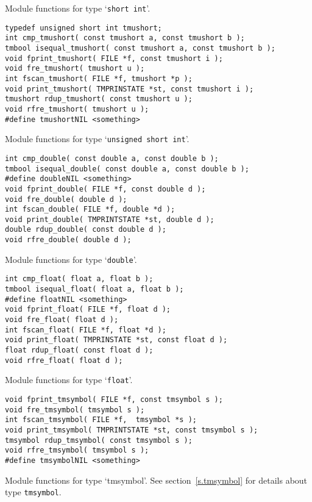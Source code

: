 \begin{desc}
Module functions for type `{\tt short int}'.
\end{desc}
\begin{verbatim}
typedef unsigned short int tmushort;
int cmp_tmushort( const tmushort a, const tmushort b );
tmbool isequal_tmushort( const tmushort a, const tmushort b );
void fprint_tmushort( FILE *f, const tmushort i );
void fre_tmushort( tmushort u );
int fscan_tmushort( FILE *f, tmushort *p );
void print_tmushort( TMPRINSTATE *st, const tmushort i );
tmushort rdup_tmushort( const tmushort u );
void rfre_tmushort( tmushort u );
#define tmushortNIL <something>
\end{verbatim}
\begin{desc}
Module functions for type `{\tt unsigned short int}'.
\end{desc}
\begin{verbatim}
int cmp_double( const double a, const double b );
tmbool isequal_double( const double a, const double b );
#define doubleNIL <something>
void fprint_double( FILE *f, const double d );
void fre_double( double d );
int fscan_double( FILE *f, double *d );
void print_double( TMPRINTSTATE *st, double d );
double rdup_double( const double d );
void rfre_double( double d );
\end{verbatim}
\begin{desc}
Module functions for type `{\tt double}'.
\end{desc}
\begin{verbatim}
int cmp_float( float a, float b );
tmbool isequal_float( float a, float b );
#define floatNIL <something>
void fprint_float( FILE *f, float d );
void fre_float( float d );
int fscan_float( FILE *f, float *d );
void print_float( TMPRINSTATE *st, const float d );
float rdup_float( const float d );
void rfre_float( float d );
\end{verbatim}
\begin{desc}
Module functions for type `{\tt float}'.
\end{desc}
\begin{verbatim}
void fprint_tmsymbol( FILE *f, const tmsymbol s );
void fre_tmsymbol( tmsymbol s );
int fscan_tmsymbol( FILE *f,  tmsymbol *s );
void print_tmsymbol( TMPRINTSTATE *st, const tmsymbol s );
tmsymbol rdup_tmsymbol( const tmsymbol s );
void rfre_tmsymbol( tmsymbol s );
#define tmsymbolNIL <something>
\end{verbatim}
\begin{desc}
Module functions for type `tmsymbol'.
See section~\ref{s.tmsymbol} for details about type \verb"tmsymbol".
\end{desc}
